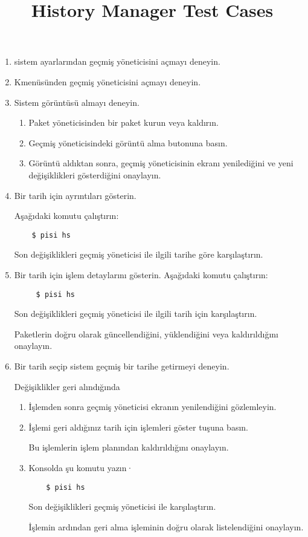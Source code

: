 \documentclass[a4paper,10pt]{article}
\title{History Manager Test Cases}
\begin{document}
\maketitle

\begin{enumerate}
\item sistem ayarlarından geçmiş yöneticisini açmayı deneyin.
\item Kmenüsünden geçmiş yöneticisini açmayı deneyin.
\item Sistem görüntüsü almayı deneyin.
\begin{enumerate}
    \item Paket yöneticisinden bir paket kurun veya kaldırın.
    \item Geçmiş yöneticisindeki görüntü alma butonuna basın.
    \item Görüntü aldıktan sonra, geçmiş yöneticisinin ekranı yenilediğini ve yeni değişiklikleri gösterdiğini onaylayın.
\end{enumerate}

\item Bir tarih için ayrıntıları gösterin.

    Aşağıdaki komutu çalıştırın:
\begin{verbatim}
    $ pisi hs
\end{verbatim} 

    Son değişiklikleri geçmiş yöneticisi ile ilgili tarihe göre karşılaştırın.

\item Bir tarih için işlem detaylarını gösterin.
    Aşağıdaki komutu çalıştırın:
\begin{verbatim}
     $ pisi hs
\end{verbatim} 
    Son değişiklikleri geçmiş yöneticisi ile ilgili tarih için karşılaştırın.

    Paketlerin doğru olarak güncellendiğini, yüklendiğini veya kaldırıldığını onaylayın.

\item Bir tarih seçip sistem geçmiş bir tarihe getirmeyi deneyin.

        Değişiklikler geri alındığında 
\begin{enumerate}
        \item İşlemden sonra geçmiş yöneticisi ekranın yenilendiğini gözlemleyin.
        \item İşlemi geri aldığınız tarih için işlemleri göster tuşuna basın.

			  Bu işlemlerin işlem planından kaldırıldığını onaylayın.
     	\item Konsolda şu komutu yazın·
\begin{verbatim}
    $ pisi hs
\end{verbatim} 

            Son değişiklikleri geçmiş yöneticisi ile karşılaştırın.

			İşlemin ardından geri alma işleminin doğru olarak listelendiğini onaylayın.
\end{enumerate}
\end{enumerate}
\end{document}
